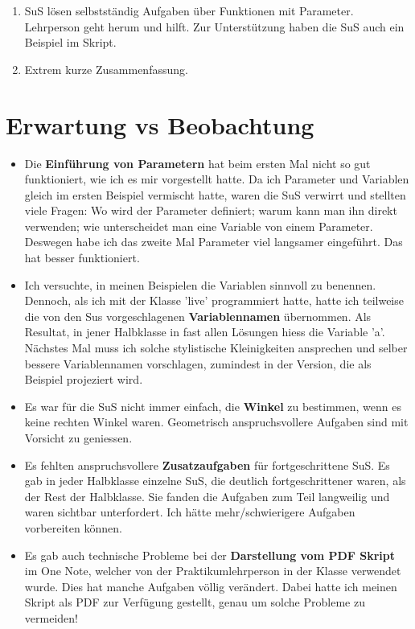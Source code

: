 \documentclass{article}
\begin{document}
\begin{enumerate}
\item SuS lösen selbstständig Aufgaben über Funktionen mit Parameter. Lehrperson geht herum und hilft. Zur Unterstützung haben die SuS auch ein Beispiel im Skript.
\item Extrem kurze Zusammenfassung.
\end{enumerate}


\section*{Erwartung vs Beobachtung}
\begin{itemize}
\item Die \textbf{Einführung von Parametern} hat beim ersten Mal nicht so gut funktioniert, wie ich es mir vorgestellt hatte. Da ich Parameter und Variablen gleich im ersten Beispiel vermischt hatte, waren die SuS verwirrt und stellten viele Fragen: Wo wird der Parameter definiert; warum kann man ihn direkt verwenden; wie unterscheidet man eine Variable von einem Parameter. Deswegen habe ich das zweite Mal Parameter viel langsamer eingeführt. Das hat besser funktioniert.

\item Ich versuchte, in meinen Beispielen die Variablen sinnvoll zu benennen. Dennoch, als ich mit der Klasse 'live' programmiert hatte, hatte ich teilweise die von den Sus vorgeschlagenen \textbf{Variablennamen} übernommen. Als Resultat, in jener Halbklasse in fast allen Lösungen hiess die Variable 'a'. Nächstes Mal muss ich solche stylistische Kleinigkeiten ansprechen und selber bessere Variablennamen vorschlagen, zumindest in der Version, die als Beispiel projeziert wird.

\item Es war für die SuS nicht immer einfach, die \textbf{Winkel} zu bestimmen, wenn es keine rechten Winkel waren. Geometrisch anspruchsvollere Aufgaben sind mit Vorsicht zu geniessen.

\item Es fehlten anspruchsvollere \textbf{Zusatzaufgaben} für fortgeschrittene SuS. Es gab in jeder Halbklasse einzelne SuS, die deutlich fortgeschrittener waren, als der Rest der Halbklasse. Sie fanden die Aufgaben zum Teil langweilig und waren sichtbar unterfordert. Ich hätte mehr/schwierigere Aufgaben vorbereiten können.

\item Es gab auch technische Probleme bei der \textbf{Darstellung vom PDF Skript} im One Note, welcher von der Praktikumlehrperson in der Klasse verwendet wurde. Dies hat manche Aufgaben völlig verändert. Dabei hatte ich meinen Skript als PDF zur Verfügung gestellt, genau um solche Probleme zu vermeiden!
\end{itemize}
\end{document}
